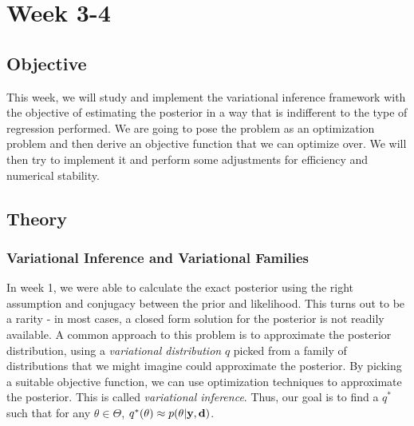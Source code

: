 \section{Week 3-4}
\subsection{Objective}
This week, we will study and implement the variational inference framework with the objective of
estimating the posterior in a way that is indifferent to the type of regression performed.
We are going to pose the problem as an optimization problem and then derive an objective function that we can optimize over.
We will then try to implement it and perform some adjustments for efficiency and numerical stability.
\subsection{Theory}
\subsubsection{Variational Inference and Variational Families}
In week 1, we were able to calculate the exact posterior using the right assumption and conjugacy between the prior and likelihood.
This turns out to be a rarity - in most cases, a closed form solution for the posterior is not readily available.
A common approach to this problem is to approximate the posterior distribution, using a \textit{variational distribution} $q$ picked from a family of distributions 
that we might imagine could approximate the posterior.
By picking a suitable objective function, we can use optimization techniques to approximate the posterior.
This is called \textit{variational inference}. Thus, our goal is to find a $q^*$ such that for any $\theta\in \Theta$, $q^*(\theta) \approx p(\theta | \mathbf{y}, \mathbf{d})$.
